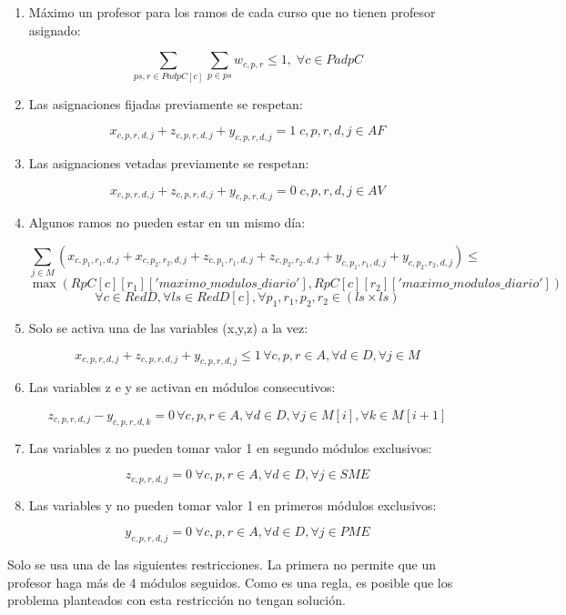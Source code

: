 \documentclass[letterpaper]{article}
\begin{document}
\begin{enumerate}
    \item Máximo un profesor para los ramos de cada curso que no tienen profesor asignado:

    $$\sum_{ps,r \in PadpC[c]} \sum_{p \in ps} w_{c,p,r} \leq 1, \; \forall c \in PadpC$$

    \item Las asignaciones fijadas previamente se respetan:

    $$x_{c,p,r,d,j} + z_{c,p,r,d,j} + y_{c,p,r,d,j} = 1 \; c,p,r,d,j \in AF$$

    \item Las asignaciones vetadas previamente se respetan:

    $$x_{c,p,r,d,j} + z_{c,p,r,d,j} + y_{c,p,r,d,j} = 0 \; c,p,r,d,j \in AV$$

    \item Algunos ramos no pueden estar en un mismo día:

    $$\sum_{j \in M} (x_{c,p_1,r_1,d,j} + x_{c,p_2,r_2,d,j} + z_{c,p_1,r_1,d,j} + z_{c,p_2,r_2,d,j} + y_{c,p_1,r_1,d,j} + y_{c,p_2,r_2,d,j}) \leq$$ 
    $$\max(RpC[c][r_1]['maximo\_modulos\_diario'],RpC[c][r_2]['maximo\_modulos\_diario'])$$
    $$\forall c \in RedD, \forall ls \in RedD[c], \forall p_1,r_1,p_2,r_2 \in (ls \times ls)$$

    \item Solo se activa una de las variables (x,y,z) a la vez:

    $$x_{c,p,r,d,j} + z_{c,p,r,d,j} + y_{c,p,r,d,j} \leq 1 \, \forall c,p,r \in A, \forall d \in D, \forall j \in M$$

    \item Las variables z e y se activan en módulos consecutivos:

    $$z_{c,p,r,d,j} - y_{c,p,r,d,k} = 0 \, \forall c,p,r \in A, \forall d \in D, \forall j \in M[i], \forall k \in M[i+1]$$

    \item Las variables z no pueden tomar valor 1 en segundo módulos exclusivos:

    $$z_{c,p,r,d,j} = 0 \; \forall c,p,r \in A, \forall d \in D, \forall j \in SME$$

    \item Las variables y no pueden tomar valor 1 en primeros módulos exclusivos:

    $$y_{c,p,r,d,j} = 0 \; \forall c,p,r \in A, \forall d \in D, \forall j \in PME$$
\end{enumerate}

Solo se usa una de las siguientes restricciones. La primera no permite que un profesor haga más de 4 módulos seguidos. Como es una regla, es posible que los problema planteados con esta restricción no tengan solución.
\end{document}
